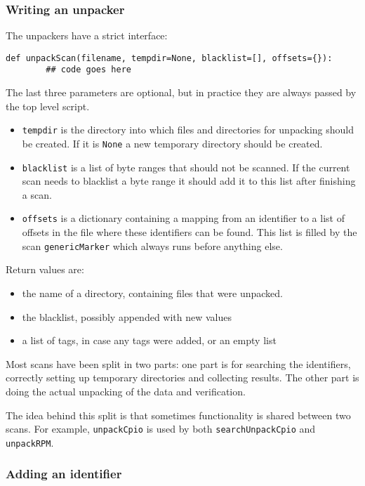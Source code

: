 \documentclass[10pt]{article}
\begin{document}
\subsubsection{Writing an unpacker}

The unpackers have a strict interface:

\begin{verbatim}
def unpackScan(filename, tempdir=None, blacklist=[], offsets={}):
        ## code goes here
\end{verbatim}

The last three parameters are optional, but in practice they are always passed
by the top level script.

\begin{itemize}
\item \texttt{tempdir} is the directory into which files and directories for
unpacking should be created. If it is \texttt{None} a new temporary directory
should be created.
\item \texttt{blacklist} is a list of byte ranges that should not be scanned.
If the current scan needs to blacklist a byte range it should add it to this
list after finishing a scan.
\item \texttt{offsets} is a dictionary containing a mapping from an identifier
to a list of offsets in the file where these identifiers can be found. This
list is filled by the scan \texttt{genericMarker} which always runs before
anything else.
\end{itemize}

Return values are:

\begin{itemize}
\item the name of a directory, containing files that were unpacked.
\item the blacklist, possibly appended with new values
\item a list of tags, in case any tags were added, or an empty list
\end{itemize}

Most scans have been split in two parts: one part is for searching the
identifiers, correctly setting up temporary directories and collecting results.
The other part is doing the actual unpacking of the data and verification.

The idea behind this split is that sometimes functionality is shared between
two scans. For example, \texttt{unpackCpio} is used by both
\texttt{searchUnpackCpio} and \texttt{unpackRPM}.

\subsubsection{Adding an identifier}
\end{document}
